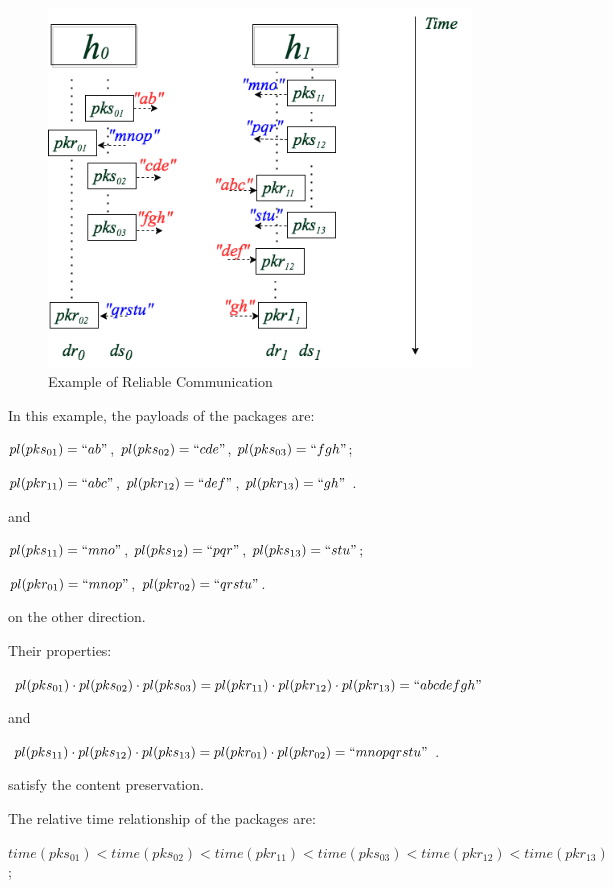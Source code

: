 \begin{figure}[H]
\centerline{\includegraphics[scale=0.55]{Figures/reliableexample}}
\caption{Example of Reliable Communication}
\label{reliableexample}
\end{figure}

In this example, the payloads of the packages are:

$pl(pks_{01})=``ab"$, $ pl(pks_{02})=``cde"$, $pl(pks_{03})=``fgh"$;

$pl(pkr_{11})=``abc"$, $pl(pkr_{12})=``def"$, $pl(pkr_{13})=``gh"$ .

and 

$pl(pks_{11})=``mno"$, $pl(pks_{12})=``pqr"$, $pl(pks_{13})=``stu"$;

$pl(pkr_{01})=``mnop"$, $pl(pkr_{02})=``qrstu"$. 

on the other direction. 

Their properties:

$pl(pks_{01}) \cdot pl(pks_{02}) \cdot pl(pks_{03}) = pl(pkr_{11}) \cdot pl(pkr_{12}) \cdot pl(pkr_{13}) = ``abcdefgh"$ 

and

$pl(pks_{11}) \cdot pl(pks_{12}) \cdot pl(pks_{13}) = pl(pkr_{01}) \cdot pl(pkr_{02}) = ``mnopqrstu"$. 

satisfy the content preservation. 

The relative time relationship of the packages are: 

$time(pks_{01}) < time(pks_{02}) < time(pkr_{11})< time(pks_{03}) < time(pkr_{12}) < time(pkr_{13}) $;

